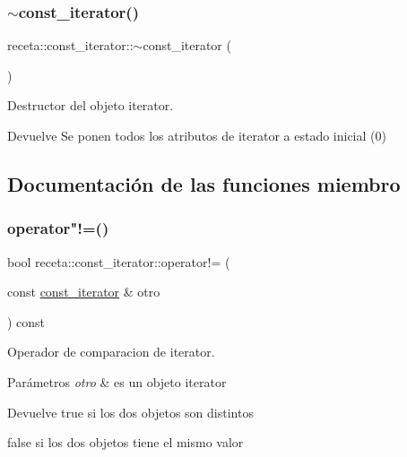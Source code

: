 \subsubsection{\texorpdfstring{$\sim$const\+\_\+iterator()}{~const\_iterator()}}
{\footnotesize\ttfamily receta\+::const\+\_\+iterator\+::$\sim$const\+\_\+iterator (\begin{DoxyParamCaption}{ }\end{DoxyParamCaption})\hspace{0.3cm}{\ttfamily [inline]}}



Destructor del objeto iterator. 

\begin{DoxyReturn}{Devuelve}
Se ponen todos los atributos de iterator a estado inicial (0) 
\end{DoxyReturn}


\subsection{Documentación de las funciones miembro}
\mbox{\label{classreceta_1_1const__iterator_aaba8aa502a2f4e92d3f8a64c68787ff6}} 
\subsubsection{\texorpdfstring{operator"!=()}{operator!=()}}
{\footnotesize\ttfamily bool receta\+::const\+\_\+iterator\+::operator!= (\begin{DoxyParamCaption}\item[{const \hyperlink{classreceta_1_1const__iterator}{const\+\_\+iterator} \&}]{otro }\end{DoxyParamCaption}) const}



Operador de comparacion de iterator. 


\begin{DoxyParams}{Parámetros}
{\em otro} & es un objeto iterator \\
\hline
\end{DoxyParams}
\begin{DoxyReturn}{Devuelve}
true si los dos objetos son distintos 

false si los dos objetos tiene el mismo valor 
\end{DoxyReturn}
\mbox{\label{classreceta_1_1const__iterator_af0293173fe41022e8307d70405a1a592}} 
